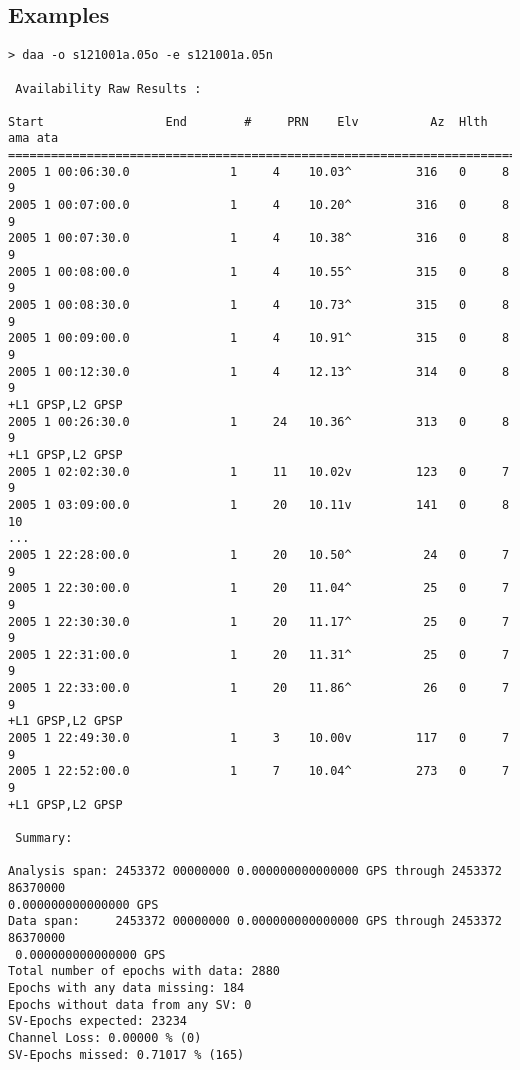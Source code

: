 \subsection{Examples}
\begin{verbatim}
> daa -o s121001a.05o -e s121001a.05n

 Availability Raw Results :

Start                 End        #     PRN    Elv          Az  Hlth  ama ata
============================================================================
2005 1 00:06:30.0              1     4    10.03^         316   0     8   9   
2005 1 00:07:00.0              1     4    10.20^         316   0     8   9   
2005 1 00:07:30.0              1     4    10.38^         316   0     8   9   
2005 1 00:08:00.0              1     4    10.55^         315   0     8   9   
2005 1 00:08:30.0              1     4    10.73^         315   0     8   9   
2005 1 00:09:00.0              1     4    10.91^         315   0     8   9   
2005 1 00:12:30.0              1     4    12.13^         314   0     8   9   
+L1 GPSP,L2 GPSP
2005 1 00:26:30.0              1     24   10.36^         313   0     8   9  
+L1 GPSP,L2 GPSP
2005 1 02:02:30.0              1     11   10.02v         123   0     7   9   
2005 1 03:09:00.0              1     20   10.11v         141   0     8   10  
...
2005 1 22:28:00.0              1     20   10.50^          24   0     7   9   
2005 1 22:30:00.0              1     20   11.04^          25   0     7   9   
2005 1 22:30:30.0              1     20   11.17^          25   0     7   9   
2005 1 22:31:00.0              1     20   11.31^          25   0     7   9   
2005 1 22:33:00.0              1     20   11.86^          26   0     7   9   
+L1 GPSP,L2 GPSP
2005 1 22:49:30.0              1     3    10.00v         117   0     7   9   
2005 1 22:52:00.0              1     7    10.04^         273   0     7   9   
+L1 GPSP,L2 GPSP

 Summary:

Analysis span: 2453372 00000000 0.000000000000000 GPS through 2453372 86370000 
0.000000000000000 GPS
Data span:     2453372 00000000 0.000000000000000 GPS through 2453372 86370000 
 0.000000000000000 GPS
Total number of epochs with data: 2880
Epochs with any data missing: 184
Epochs without data from any SV: 0
SV-Epochs expected: 23234
Channel Loss: 0.00000 % (0)
SV-Epochs missed: 0.71017 % (165)
\end{verbatim}

%
